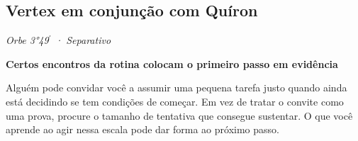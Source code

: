 \documentclass[11pt,a4paper]{article}
\newcommand{\leitura}[3]{\subsection{#1}\textit{#2}\par #3}
\newcommand{\subtituloleitura}[1]{\textbf{#1}\par\nopagebreak[4]}
\begin{document}
\leitura{Vertex em conjunção com Quíron}{Orbe 3°49\ensuremath{^{\prime}} · Separativo}{
\subtituloleitura{Certos encontros da rotina colocam o primeiro passo em evidência}
Alguém pode convidar você a assumir uma pequena tarefa justo quando ainda está decidindo se tem condições de começar. Em vez de tratar o convite como uma prova, procure o tamanho de tentativa que consegue sustentar. O que você aprende ao agir nessa escala pode dar forma ao próximo passo.
}
\end{document}
